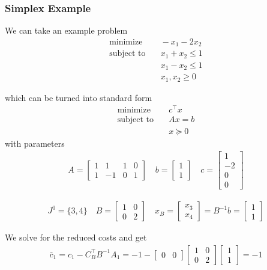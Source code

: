 \subsubsection{Simplex Example}
We can take an example problem
\begin{align}
  \text{minimize} & \quad -x_1 - 2x_2 \\
  \text{subject to} & \quad x_1 + x_2 \leq 1 \\
  & \quad x_1 - x_2 \leq 1 \\
  & \quad x_1, x_2 \geq 0
\end{align}

which can be turned into standard form 
\begin{align}
  \text{minimize} & \quad c^\top x \\
  \text{subject to} & \quad Ax = b \\
  & \quad  x \succeq 0
\end{align}
with parameters 
\begin{align}
    A = 
  \begin{bmatrix}
     1 & 1 & 1 & 0 \\
     1 & -1 & 0 & 1
  \end{bmatrix}
  \quad
  b = 
  \begin{bmatrix}
    1 \\ 1
  \end{bmatrix}
  \quad
  c = 
  \begin{bmatrix}
    1 \\ -2 \\ 0 \\ 0
  \end{bmatrix}
\end{align}

\begin{align}
    J^0 = \{ 3,4 \}
    \quad 
    B = 
    \begin{bmatrix}
        1 & 0 \\ 0 & 2
    \end{bmatrix}
    \quad
    x_B = 
    \begin{bmatrix}
        x_3 \\ x_4
    \end{bmatrix} 
    = B^{-1} b = 
    \begin{bmatrix}
        1 \\ 1
    \end{bmatrix}
\end{align}

We solve for the reduced costs and get
\begin{align}
    \bar{c}_1 = c_1 - C_B^\top B^{-1} A_1 =
    -1 -
  \begin{bmatrix}
     0 & 0
  \end{bmatrix}
  \begin{bmatrix}
    1 & 0 \\ 0 & 2
  \end{bmatrix}
  \begin{bmatrix}
    1 \\ 1
  \end{bmatrix}
  = -1
\end{align}

